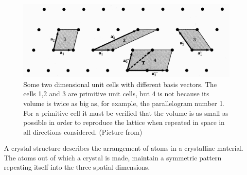 	\FloatBarrier
	\begin{figure}[tbp]
		\centering
		\includegraphics[width=.9\linewidth]{andere_bilder/basis_2dim.png}
		\caption{Some two dimensional unit cells with different basis vectors. The cells 1,2 and 3 are primitive unit cells, but 4 
		is not because its volume is twice as big as, for example, the parallelogram number 1. For a primitive cell it must be verified that the volume is as small as possible in order to reproduce the lattice when repeated in space in all directions considered. 
		(Picture from\cite{Kittel})}\label{basis_2dim}
	\end{figure}

	A crystal structure describes the arrangement of atoms in a crystalline material. The atoms out of which a crystal is made, maintain a symmetric pattern repeating itself into the three spatial dimensions. 
	
